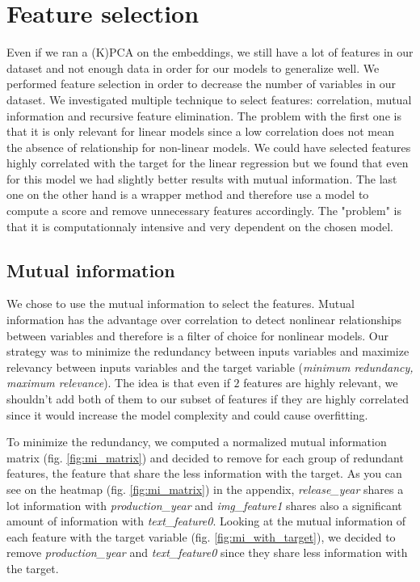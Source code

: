 \section{Feature selection}

Even if we ran a (K)PCA on the embeddings, we still have a lot of features in our dataset and not enough data in order for our models to generalize well. We performed feature selection in order to decrease the number of variables in our dataset. We investigated multiple technique to select features: correlation, mutual information and recursive feature elimination. The problem with the first one is that it is only relevant for linear models since a low correlation does not mean the absence of relationship for non-linear models. We could have selected features highly correlated with the target for the linear regression but we found that even for this model we had slightly better results with mutual information. The last one on the other hand is a wrapper method and therefore use a model to compute a score and remove unnecessary features accordingly. The "problem" is that it is computationnaly intensive and very dependent on the chosen model.

\subsection{Mutual information}

We chose to use the mutual information to select the features. Mutual information has the advantage over correlation to detect nonlinear relationships between variables and therefore is a filter of choice for nonlinear models. Our strategy was to minimize the redundancy between inputs variables and maximize relevancy between inputs variables and the target variable (\textit{minimum redundancy, maximum relevance}). The idea is that even if $2$ features are highly relevant, we shouldn't add both of them to our subset of features if they are highly correlated since it would increase the model complexity and could cause overfitting.

To minimize the redundancy, we computed a normalized mutual information matrix (fig. \ref{fig:mi_matrix}) and decided to remove for each group of redundant features, the feature that share the less information with the target. As you can see on the heatmap (fig. \ref{fig:mi_matrix}) in the appendix, \textit{release\_year} shares a lot information with \textit{production\_year} and \textit{img\_feature1} shares also a significant amount of information with \textit{text\_feature0}. Looking at the mutual information of each feature with the target variable (fig. \ref{fig:mi_with_target}), we decided to remove \textit{production\_year} and \textit{text\_feature0} since they share less information with the target.

